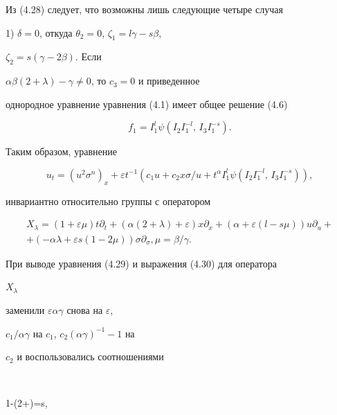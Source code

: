 Из (4.28) следует, что возможны лишь следующие четыре случая





1) $\delta=0$, откуда $\theta_2=0$, $\zeta_1=l\gamma-s\beta$,


$\zeta_2=s(\gamma-2\beta)$. Если


$\alpha\beta(2+\lambda)-\gamma\ne 0$, то $c_3=0$ и приведенное


однородное уравнение уравнения (4.1) имеет общее решение (4.6)


$$


f_1=I^l_1\psi(I_2I^{-l}_1,\,I_3I^{-s}_1).


$$


Таким образом, уравнение


\begin{equation}


u_t=(u^2\sigma^n)_x+\varepsilon t^{-1}(c_1u+c_2x\sigma/u+


t^\alpha I^l_1\psi(I_2I^{-l}_1,\,I_3I^{-s}_1)),\tag{4.29}


\end{equation}


инвариантно относительно группы с оператором


\begin{multline}


X_\lambda=(1+\varepsilon\mu)t\partial_t+(\alpha(2+\lambda)+


\varepsilon)x\partial_x+(\alpha+\varepsilon(l-s\mu))


u\partial_u+\\


+(-\alpha\lambda+\varepsilon s(1-2\mu))


\sigma\partial_\sigma,


\mu=\beta/\gamma. \tag{4.30}


\end{multline}


При выводе уравнения (4.29) и выражения (4.30) для оператора


$X_\lambda$


заменили $\varepsilon\alpha\gamma$ снова на $\varepsilon$,


$c_1/\alpha\gamma$ на $c_1$, $c_2(\alpha\gamma)^{-1}-1$ на


$c_2$ и воспользовались соотношениями


$$




{1-\alpha\mu(2+\lambda)}=s,\qquad


